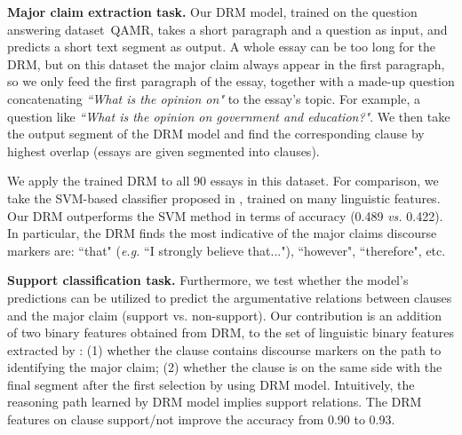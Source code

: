 

\textbf{Major claim extraction task.} Our DRM model, trained on the question answering dataset~\textsc{QAMR},  takes a short paragraph and a question as input, and predicts a short text segment as output. A whole essay can be too long for the DRM, but on this dataset the major claim always appear in the first paragraph, so we only feed the first paragraph of the essay, together with a made-up question concatenating \textit{``What is the opinion on"} to the essay's topic. For example, a question like \textit{``What is the opinion on government and education?"}. We then take the output segment of the DRM model and find the corresponding clause by highest overlap (essays are given segmented into clauses). 

We apply the trained DRM to all 90 essays in this dataset. For comparison, we take the SVM-based classifier proposed in \cite{DBLP:conf/emnlp/StabG14}, trained on many linguistic features. Our DRM outperforms the SVM method in terms of accuracy (0.489 \emph{vs.} 0.422). In particular, the DRM finds the most indicative of the major claims discourse markers  are: ``that" (\emph{e.g.} ``I strongly believe that..."), ``however", ``therefore", etc.




\textbf{Support classification task.}  Furthermore, we test whether the model's predictions can be utilized to predict the argumentative relations between clauses and the major claim (support vs. non-support). Our contribution is an addition of two binary features obtained from DRM, to the set of linguistic binary features extracted by \cite{DBLP:conf/emnlp/StabG14}: (1) whether the clause contains discourse markers on the path to identifying the major claim; (2) whether the clause is on the same side with the final segment after the first selection by using DRM model. Intuitively, the reasoning path learned by DRM model implies support relations. The DRM features on clause support/not improve the accuracy from 0.90 to 0.93.


